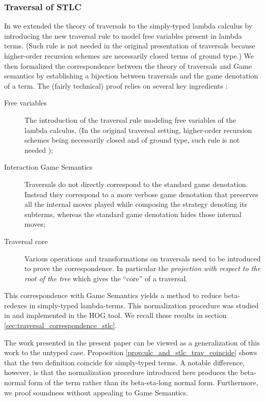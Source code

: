 \documentclass{article}
\theoremstyle{definition}
\begin{document}
\subsubsection{Traversal of STLC}

In \cite{BlumPhd} we extended the theory of traversals to the simply-typed lambda calculus by introducing the new traversal rule  to model free variables present in lambda terms. (Such rule is not needed in the original presentation of traversals because higher-order recursion schemes are necessarily closed terms of ground type\cite{Ong2006}.) We then formalized the correspondence between the theory of traversals and Game semantics by establishing a bijection between traversals and the game denotation of a term. The (fairly technical) proof relies on several key ingredients \cite{BlumPhd}:
\begin{description}
  \item[Free variables] The introduction of the traversal rule  modeling  free variables of the lambda calculus. (In the original traversal setting, higher-order recursion schemes being necessarily closed and of ground type, such rule is not needed \cite{Ong2006});
  \item[Interaction Game Semantics] Traversals do not directly correspond to the standard game denotation. Instead they correspond to a more verbose game denotation that preserves all the internal moves played while composing the strategy denoting its subterms, whereas the standard game denotation hides those internal moves;
  \item[Traversal core] Various operations and transformations on traversals need to be introduced to prove the correspondence. In particular the \emph{projection with respect to the root of the tree} which gives the ``core'' of a traversal.
\end{description}

 This correspondence with Game Semantics yields a method to reduce beta-redexes in simply-typed lambda-terms. This normalization procedure was studied in \cite{BlumPhd,BlumGalop2008,Blum-HogTool,Ong-NormByTrav2015} and implemented in the HOG tool\cite{BlumGalop2008, BlumPhd}. We recall these results in section \ref{sec:traversal_correspondence_stlc}.

The work presented in the present paper can be viewed as a generalization of this work to the untyped case. Proposition \ref{prop:ulc_and_stlc_trav_coincide} shows that the two definition coincide for simply-typed terms.
A notable difference, however, is that the normalization procedure introduced here produces the beta-normal form of the term rather than its beta-eta-long normal form. Furthermore, we proof soundness without appealing to Game Semantics.
\end{document}
